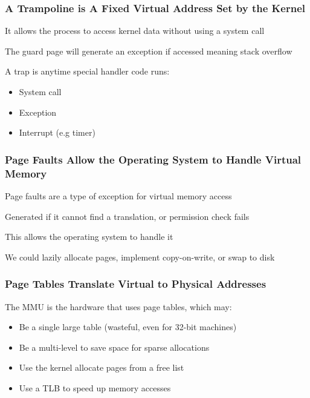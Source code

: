   \begin{frame}
    \frametitle{A Trampoline is A Fixed Virtual Address Set by the Kernel}

    It allows the process to access kernel data without using
    a system call

    \vspace{2em}

    The guard page will generate an exception if accessed meaning stack overflow

    \vspace{2em}

    A trap is anytime special handler code runs:
    \begin{itemize}
      \item System call
      \item Exception
      \item Interrupt (e.g timer)
    \end{itemize}
  \end{frame}

  \begin{frame}
    \frametitle{Page Faults Allow the Operating System to Handle Virtual Memory}

    Page faults are a type of exception for virtual memory access

    \hspace{2em} Generated if it cannot find a translation, or permission check fails

    \vspace{2em}

    This allows the operating system to handle it

    \hspace{2em} We could lazily allocate pages, implement copy-on-write, or swap to disk
  \end{frame}

  \begin{frame}
    \frametitle{Page Tables Translate Virtual to Physical Addresses}

    The MMU is the hardware that uses page tables, which may:
    \begin{itemize}
      \item Be a single large table (wasteful, even for 32-bit machines)
      \item Be a multi-level to save space for sparse allocations
      \item Use the kernel allocate pages from a free list
      \item Use a TLB to speed up memory accesses
    \end{itemize}
  \end{frame}

